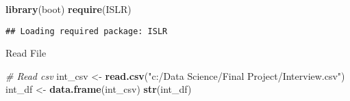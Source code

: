\documentclass[]{article}
\newenvironment{Shaded}{\begin{snugshade}}{\end{snugshade}}
\newcommand{\KeywordTok}[1]{\textcolor[rgb]{0.13,0.29,0.53}{\textbf{#1}}}
\newcommand{\StringTok}[1]{\textcolor[rgb]{0.31,0.60,0.02}{#1}}
\newcommand{\CommentTok}[1]{\textcolor[rgb]{0.56,0.35,0.01}{\textit{#1}}}
\newcommand{\NormalTok}[1]{#1}
\begin{document}
\begin{Shaded}
\begin{Highlighting}[]
\KeywordTok{library}\NormalTok{(boot)}
\KeywordTok{require}\NormalTok{(ISLR)}
\end{Highlighting}
\end{Shaded}

\begin{verbatim}
## Loading required package: ISLR
\end{verbatim}

Read File

\begin{Shaded}
\begin{Highlighting}[]
\CommentTok{# Read csv}
\NormalTok{int_csv <-}\StringTok{ }\KeywordTok{read.csv}\NormalTok{(}\StringTok{"c:/Data Science/Final Project/Interview.csv"}\NormalTok{)}
\NormalTok{int_df <-}\StringTok{ }\KeywordTok{data.frame}\NormalTok{(int_csv)}
\KeywordTok{str}\NormalTok{(int_df)}
\end{Highlighting}
\end{Shaded}
\end{document}

